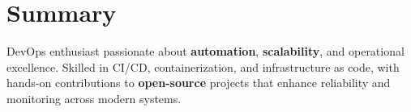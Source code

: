 \section{Summary}

\begin{onecolentry}
	DevOps enthusiast passionate about \textbf{automation}, \textbf{scalability}, and operational excellence.
	Skilled in CI/CD, containerization, and infrastructure as code, with hands-on contributions to
	\textbf{open-source} projects that enhance reliability and monitoring across modern systems.
\end{onecolentry}
